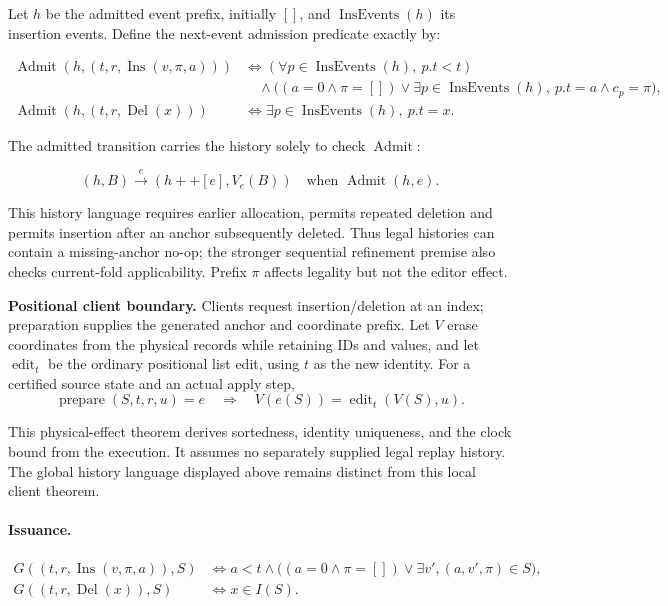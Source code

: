 Let $h$ be the admitted event prefix, initially $[]$, and $\operatorname{InsEvents}(h)$ its insertion events. Define the next-event admission predicate exactly by:

\[
\begin{aligned}\operatorname{Admit}(h,(t,r,\operatorname{Ins}(v,\pi,a)))&\iff(\forall p\in\operatorname{InsEvents}(h),\ p.t<t)\\&\quad\land\big((a=0\land\pi=[])\lor\exists p\in\operatorname{InsEvents}(h),\ p.t=a\land c_p=\pi\big),\\\operatorname{Admit}(h,(t,r,\operatorname{Del}(x)))&\iff\exists p\in\operatorname{InsEvents}(h),\ p.t=x.\end{aligned}
\]


The admitted transition carries the history solely to check $\operatorname{Admit}$:

\[
(h,B)\xrightarrow{e}(h++[e],V_e(B))\quad\text{when }\operatorname{Admit}(h,e).
\]


This history language requires earlier allocation, permits repeated deletion and permits insertion after an anchor subsequently deleted. Thus legal histories can contain a missing-anchor no-op; the stronger sequential refinement premise also checks current-fold applicability. Prefix $\pi$ affects legality but not the editor effect.

\textbf{Positional client boundary.} Clients request insertion/deletion at an index; preparation supplies the generated anchor and coordinate prefix. Let $V$ erase coordinates from the physical records while retaining IDs and values, and let $\operatorname{edit}_t$ be the ordinary positional list edit, using $t$ as the new identity. For a certified source state and an actual apply step,
\[
\operatorname{prepare}(S,t,r,u)=e\quad\Longrightarrow\quad V(e(S))=\operatorname{edit}_t(V(S),u).
\]

This physical-effect theorem derives sortedness, identity uniqueness, and the clock bound from the execution. It assumes no separately supplied legal replay history. The global history language displayed above remains distinct from this local client theorem.


\paragraph{Issuance.}
\[
\begin{aligned}G((t,r,\operatorname{Ins}(v,\pi,a)),S)&\iff a<t\land\big((a=0\land\pi=[])\lor\exists v',(a,v',\pi)\in S\big),\\G((t,r,\operatorname{Del}(x)),S)&\iff x\in I(S).\end{aligned}
\]


